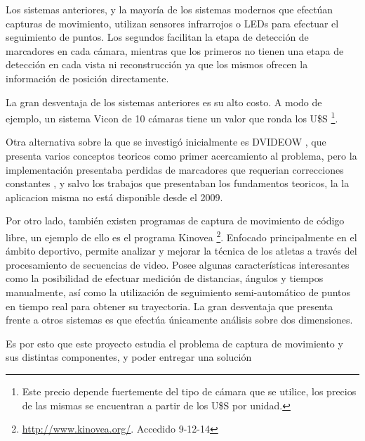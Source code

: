 Los sistemas anteriores, y la mayoría de los sistemas modernos que efectúan capturas de movimiento, utilizan sensores infrarrojos o LEDs para efectuar el seguimiento de puntos. Los segundos facilitan la etapa de detección de marcadores en cada cámara, mientras que los primeros no tienen una etapa de detección en cada vista ni reconstrucción ya que los mismos ofrecen la información de posición directamente.

La gran desventaja de los sistemas anteriores es su alto costo. A modo de ejemplo, un sistema Vicon de 10 cámaras tiene un valor que ronda los U\$S \footnote{Este precio depende fuertemente del tipo de cámara que se utilice, los precios de las mismas se encuentran a partir de los U\$S por unidad.}.

Otra alternativa sobre la que se investigó inicialmente es DVIDEOW \cite{figueroa2003flexible}, que presenta varios conceptos teoricos como primer acercamiento al problema, pero la implementación presentaba perdidas de marcadores que requerian correcciones constantes , y salvo los trabajos que presentaban los fundamentos teoricos, la la aplicacion misma no está disponible desde el 2009.

Por otro lado, también existen programas de captura de movimiento de código libre, un ejemplo de ello es el programa Kinovea
\footnote{ \textcolor{blue}{\underline{\url{http://www.kinovea.org/}}}. Accedido 9-12-14}. Enfocado principalmente en el ámbito deportivo, permite analizar y mejorar la técnica de los atletas a través del procesamiento de secuencias de video. Posee algunas características interesantes como la posibilidad de efectuar medición de distancias, ángulos y tiempos manualmente, así como la utilización de seguimiento semi-automático de puntos en tiempo real para obtener su trayectoria. La gran desventaja que presenta frente a otros sistemas es que efectúa únicamente análisis sobre dos dimensiones.



Es por esto que este proyecto estudia el problema de captura de movimiento y sus distintas componentes, y poder entregar una solución   


